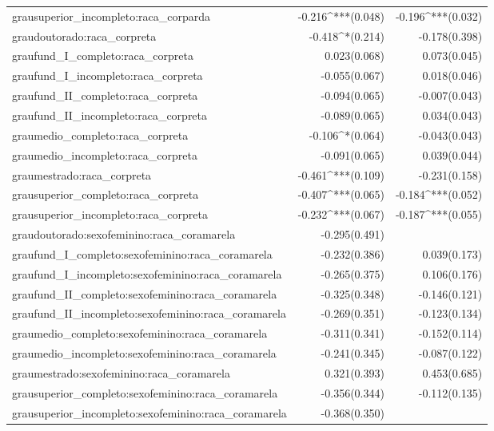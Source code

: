 \documentclass[
  12pt,
  letterpaper,
  DIV=11,
  numbers=noendperiod]{scrartcl}
\begin{document}
\begin{table}[!htbp]
\begin{tabular}{@{\extracolsep{5pt}}lD{.}{.}{-3} D{.}{.}{-3} }
  grausuperior\_incompleto:raca\_corparda & -0.216^{***}$ $(0.048) & -0.196^{***}$ $(0.032) \\ 
  graudoutorado:raca\_corpreta & -0.418^{*}$ $(0.214) & -0.178$ $(0.398) \\ 
  graufund\_I\_completo:raca\_corpreta & 0.023$ $(0.068) & 0.073$ $(0.045) \\ 
  graufund\_I\_incompleto:raca\_corpreta & -0.055$ $(0.067) & 0.018$ $(0.046) \\ 
  graufund\_II\_completo:raca\_corpreta & -0.094$ $(0.065) & -0.007$ $(0.043) \\ 
  graufund\_II\_incompleto:raca\_corpreta & -0.089$ $(0.065) & 0.034$ $(0.043) \\ 
  graumedio\_completo:raca\_corpreta & -0.106^{*}$ $(0.064) & -0.043$ $(0.043) \\ 
  graumedio\_incompleto:raca\_corpreta & -0.091$ $(0.065) & 0.039$ $(0.044) \\ 
  graumestrado:raca\_corpreta & -0.461^{***}$ $(0.109) & -0.231$ $(0.158) \\ 
  grausuperior\_completo:raca\_corpreta & -0.407^{***}$ $(0.065) & -0.184^{***}$ $(0.052) \\ 
  grausuperior\_incompleto:raca\_corpreta & -0.232^{***}$ $(0.067) & -0.187^{***}$ $(0.055) \\ 
  graudoutorado:sexofeminino:raca\_coramarela & -0.295$ $(0.491) &  \\ 
  graufund\_I\_completo:sexofeminino:raca\_coramarela & -0.232$ $(0.386) & 0.039$ $(0.173) \\ 
  graufund\_I\_incompleto:sexofeminino:raca\_coramarela & -0.265$ $(0.375) & 0.106$ $(0.176) \\ 
  graufund\_II\_completo:sexofeminino:raca\_coramarela & -0.325$ $(0.348) & -0.146$ $(0.121) \\ 
  graufund\_II\_incompleto:sexofeminino:raca\_coramarela & -0.269$ $(0.351) & -0.123$ $(0.134) \\ 
  graumedio\_completo:sexofeminino:raca\_coramarela & -0.311$ $(0.341) & -0.152$ $(0.114) \\ 
  graumedio\_incompleto:sexofeminino:raca\_coramarela & -0.241$ $(0.345) & -0.087$ $(0.122) \\ 
  graumestrado:sexofeminino:raca\_coramarela & 0.321$ $(0.393) & 0.453$ $(0.685) \\ 
  grausuperior\_completo:sexofeminino:raca\_coramarela & -0.356$ $(0.344) & -0.112$ $(0.135) \\ 
  grausuperior\_incompleto:sexofeminino:raca\_coramarela & -0.368$ $(0.350) &  \\ 

\end{tabular}
\end{table}
\end{document}
